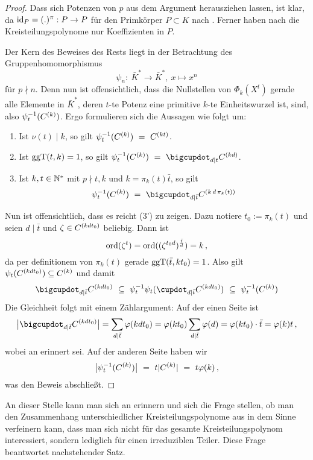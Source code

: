 \begin{proof}
  Dass sich Potenzen von $p$ aus dem Argument herausziehen lassen, ist klar,
  da $\operatorname{id}_P = (.)^\pi: P \to P$ für den Primkörper $P \subset K$ nach 
  . Ferner haben nach  die
  Kreisteilungspolynome nur Koeffizienten in $P$.

  Der Kern des Beweises des Rests liegt in der Betrachtung des 
  Gruppenhomomorphismus
  \[ \psi_n:\ \bar K^\ast \to \bar K^\ast,\ x \mapsto x^n\]
  für $p\nmid n$. Denn nun ist offensichtlich, dass die Nullstellen von 
  $\Phi_k(X^t)$ gerade alle Elemente in $\bar K^\ast$, deren $t$-te Potenz
  eine primitive $k$-te Einheitswurzel ist, sind, also $\psi_t^{-1}(C^{(k)})$.
  Ergo formulieren sich die Aussagen wie folgt um:
  \begin{enumerate}[label=(\arabic*')]
    \item Ist $\nu(t) \mid k$, so gilt
      $\psi_t^{-1}(C^{(k)}) \ =\  C^{(kt)}$.
    \item Ist $\operatorname{ggT}(t,k)=1$, so gilt
      $\psi_t\inv(C\kl k) \speq= \bigcupdot_{d\mid t} C\kl{kd}$.
    \item Ist $k,t\in \mathbb{N}^\ast$ mit $p\nmid t,k$ und $k = \pi_k(t) \bar t$,
      so gilt
      \[ \psi_t\inv(C\kl k) \speq= 
        \bigcupdot_{d\mid \bar t} C\kl{k\,d\,\pi_k(t)}\]
  \end{enumerate}
  Nun ist offensichtlich, dass es reicht (3') zu zeigen. 
  Dazu notiere $t_0 := \pi_k(t)$ und seien $d\mid \bar t$ 
  und $\zeta \in C^{(kd t_0)}$ beliebig. Dann ist 
  \[ \operatorname{ord}(\zeta^t) = \operatorname{ord}((\zeta^{t_0d})^{\frac{\bar t}{d}})
    = k\,,\]
  da per definitionem von $\pi_k(t)$ gerade $\operatorname{ggT}(\bar t, kt_0) = 1$.
  Also gilt $\psi_t(C^{(kdt_0)}) \subseteq C^{(k)}$
  und damit
  \[ \bigcupdot_{d\mid \bar t} C\kl{kdt_0} \speq\subseteq 
    \psi_t\inv \psi_t ( \cupdot_{d\mid \bar t} C\kl{kdt_0}) 
    \speq\subseteq \psi_t\inv(C\kl k)\]
  Die Gleichheit folgt mit einem Zählargument:
  Auf der einen Seite ist
  \[ \big|\bigcupdot_{d\mid \bar t} C\kl{kdt_0}\big| = 
    \sum_{d\mid \bar t} \varphi(kdt_0) = 
    \varphi(kt_0)\sum_{d\mid \bar t}\varphi(d) = \varphi(kt_0) \cdot \bar t
     = \varphi(k)t\,,\]
  wobei an  erinnert sei.
  Auf der anderen Seite haben wir
  \[ \big| \psi_t^{-1}(C ^{(k)})\big| \ =\  t |C^{(k)}| \ =\  t \varphi(k)\,,\]
  was den Beweis abschließt.
\end{proof}

An dieser Stelle kann man sich an 
erinnern und sich die Frage stellen, ob man den
Zusammenhang unterschiedlicher Kreisteilungspolynome aus 
in dem Sinne verfeinern kann, dass man sich nicht für das gesamte 
Kreisteilungspolynom interessiert, sondern lediglich für einen irreduziblen
Teiler. Diese Frage beantwortet nachstehender Satz.


